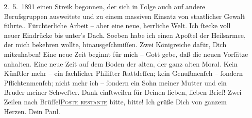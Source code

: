 \begin{ledgroupsized}[t]{13cm}
{{{                     2. 5. 1891 einen Streik begonnen, der sich in Folge auch auf
                  andere Berufsgruppen ausweitete und zu einem massiven Einsatz von staatlicher
                  Gewalt führte.}}}\label{K_L02662-1h}. Fürchterliche Arbeit – aber eine neue, herrliche Welt. Ich
               ſtecke voll neuer Eindrücke bis unter’s Dach. Soeben habe ich einen Apoſtel der Heilsarmee, der mich bekehren wollte,
               hinausgeſchmiſſen. Zwei Königreiche dafür, Dich mitzuhaben! Eine neue Zeit beginnt
               für mich – Gott gebe, daß die neuen Vorſätze anhalten. Eine neue Zeit auf dem Boden
               der alten, der ganz alten Moral. Kein Künſtler mehr – ein ſachlicher Philiſter
               ſtattdeſſen; kein Genußmenſch – ſondern \strikeout{\textcolor{gray}{nur}} Pflichtenmenſch; nicht mehr ich – ſondern ein Sohn meiner Mutter und ein Bruder meiner Schweſter. \label{K_L02662-2v}\label{K_L02662-2h} Dank einſtweilen für Deinen lieben, lieben Brief! Zwei
               Zeilen nach Brüſſel\introOben{}\textsc{\uline{Poste restante}}\introOben{}{ }{\dotstwo} bitte, bitte! Ich grüße Dich von ganzem Herzen. Dein
                  \spacefill\mbox{Paul.}\pend
           \pstart
           \noindent{}\label{T_L02662-1v}\label{T_L02662-1h}\pend
           \endnumbering{}\end{ledgroupsized}  \newcommand{\dateiname}{L02662}\newcommand{\titel}{Paul Goldmann an Arthur Schnitzler, 11. 5. 1891}\newcommand{\editorInnen}{Martin Anton Müller und Laura Untner}
      